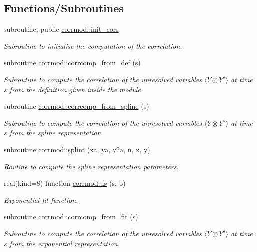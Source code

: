 \subsection*{Functions/\+Subroutines}
\begin{DoxyCompactItemize}
\item 
subroutine, public \hyperlink{namespacecorrmod_ac2e966d475b93a6f75961bc7b7cceb7d}{corrmod\+::init\+\_\+corr}
\begin{DoxyCompactList}\small\item\em Subroutine to initialise the computation of the correlation. \end{DoxyCompactList}\item 
subroutine \hyperlink{namespacecorrmod_a52bbdab69c73b4313857d71c07cb3164}{corrmod\+::corrcomp\+\_\+from\+\_\+def} (s)
\begin{DoxyCompactList}\small\item\em Subroutine to compute the correlation of the unresolved variables $\langle Y \otimes Y^s \rangle$ at time $s$ from the definition given inside the module. \end{DoxyCompactList}\item 
subroutine \hyperlink{namespacecorrmod_a4afc40b6c94d00fc18ccc378ad309a7f}{corrmod\+::corrcomp\+\_\+from\+\_\+spline} (s)
\begin{DoxyCompactList}\small\item\em Subroutine to compute the correlation of the unresolved variables $\langle Y \otimes Y^s \rangle$ at time $s$ from the spline representation. \end{DoxyCompactList}\item 
subroutine \hyperlink{namespacecorrmod_a870374ab1a440e562713b6cdc23e18e1}{corrmod\+::splint} (xa, ya, y2a, n, x, y)
\begin{DoxyCompactList}\small\item\em Routine to compute the spline representation parameters. \end{DoxyCompactList}\item 
real(kind=8) function \hyperlink{namespacecorrmod_a46265e98098a79d33314d5e1f142a91d}{corrmod\+::fs} (s, p)
\begin{DoxyCompactList}\small\item\em Exponential fit function. \end{DoxyCompactList}\item 
subroutine \hyperlink{namespacecorrmod_aaffa69da4d652347a8bb9f6030dd76c2}{corrmod\+::corrcomp\+\_\+from\+\_\+fit} (s)
\begin{DoxyCompactList}\small\item\em Subroutine to compute the correlation of the unresolved variables $\langle Y \otimes Y^s \rangle$ at time $s$ from the exponential representation. \end{DoxyCompactList}\end{DoxyCompactItemize}

